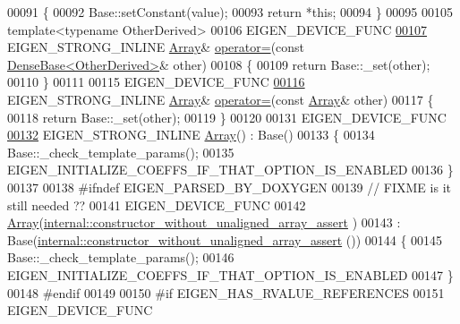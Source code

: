 \begin{DoxyCode}
00091     \{
00092       Base::setConstant(value);
00093       \textcolor{keywordflow}{return} *\textcolor{keyword}{this};
00094     \}
00095 
00105     \textcolor{keyword}{template}<\textcolor{keyword}{typename} OtherDerived>
00106     EIGEN\_DEVICE\_FUNC
\hyperlink{group___core___module_a8415de9a2e74e018c98d6e6271b307a5}{00107}     EIGEN\_STRONG\_INLINE \hyperlink{group___core___module_class_eigen_1_1_array}{Array}& \hyperlink{group___core___module_a8415de9a2e74e018c98d6e6271b307a5}{operator=}(\textcolor{keyword}{const} 
      \hyperlink{group___core___module_class_eigen_1_1_dense_base}{DenseBase<OtherDerived>}& other)
00108     \{
00109       \textcolor{keywordflow}{return} Base::\_set(other);
00110     \}
00111 
00115     EIGEN\_DEVICE\_FUNC
\hyperlink{group___core___module_a56cb38f362f88a6239f802ea226fee6a}{00116}     EIGEN\_STRONG\_INLINE \hyperlink{group___core___module_class_eigen_1_1_array}{Array}& \hyperlink{group___core___module_a56cb38f362f88a6239f802ea226fee6a}{operator=}(\textcolor{keyword}{const} \hyperlink{group___core___module_class_eigen_1_1_array}{Array}& other)
00117     \{
00118       \textcolor{keywordflow}{return} Base::\_set(other);
00119     \}
00120     
00131     EIGEN\_DEVICE\_FUNC
\hyperlink{group___core___module_a715524a79accfdc70dbc8cab1d7086ae}{00132}     EIGEN\_STRONG\_INLINE \hyperlink{group___core___module_a715524a79accfdc70dbc8cab1d7086ae}{Array}() : Base()
00133     \{
00134       Base::\_check\_template\_params();
00135       EIGEN\_INITIALIZE\_COEFFS\_IF\_THAT\_OPTION\_IS\_ENABLED
00136     \}
00137 
00138 \textcolor{preprocessor}{#ifndef EIGEN\_PARSED\_BY\_DOXYGEN}
00139     \textcolor{comment}{// FIXME is it still needed ??}
00141 \textcolor{comment}{}    EIGEN\_DEVICE\_FUNC
00142     \hyperlink{group___core___module_class_eigen_1_1_array}{Array}(\hyperlink{struct_eigen_1_1internal_1_1constructor__without__unaligned__array__assert}{internal::constructor\_without\_unaligned\_array\_assert}
      )
00143       : Base(\hyperlink{struct_eigen_1_1internal_1_1constructor__without__unaligned__array__assert}{internal::constructor\_without\_unaligned\_array\_assert}
      ())
00144     \{
00145       Base::\_check\_template\_params();
00146       EIGEN\_INITIALIZE\_COEFFS\_IF\_THAT\_OPTION\_IS\_ENABLED
00147     \}
00148 \textcolor{preprocessor}{#endif}
00149 
00150 \textcolor{preprocessor}{#if EIGEN\_HAS\_RVALUE\_REFERENCES}
00151     EIGEN\_DEVICE\_FUNC

\end{DoxyCode}
